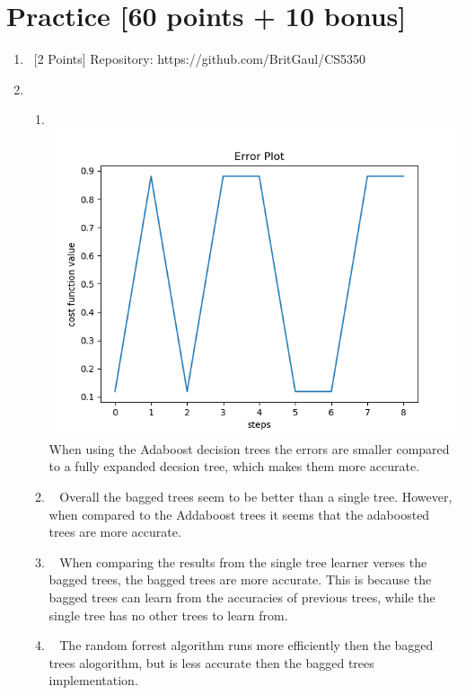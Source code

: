 \documentclass[12pt, fullpage,letterpaper]{article}
\begin{document}
\section{Practice [60 points + 10 bonus]}
\begin{enumerate}
	\item~[2 Points]  
	\newline Repository: https://github.com/BritGaul/CS5350

\item~
\begin{enumerate}
	\item~
	\newline \includegraphics{prob_2_2_a.png}
	\newline When using the Adaboost decision trees the errors are smaller compared to a fully expanded decsion tree, which makes them more accurate. 
	
	\item~
	\newline Overall the bagged trees seem to be better than a single tree. However, when compared to the Addaboost trees it seems that the adaboosted trees are more accurate. 

	\item~ 
	\newline When comparing the results from the single tree learner verses the bagged trees, the bagged trees are more accurate. This is because the bagged trees can learn from the accuracies of previous trees, while the single tree has no other trees to learn from. 
	 
	\item~ 
	\newline The random forrest algorithm runs more efficiently then the bagged trees alogorithm, but is less accurate then the bagged trees implementation. 
	

\end{enumerate}
\end{enumerate}
\end{document}
